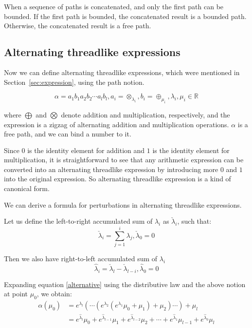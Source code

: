 When a sequence of paths is concatenated, and only the first path can be bounded.
If the first path is bounded, the concatenated result is a bounded path.
Otherwise, the concatenated result is a free path.

\subsection{Alternating threadlike expressions}\label{sec:alternating}

Now we can define alternating threadlike expressions, which were mentioned in Section~\ref{sec:expression}, using the path notion.

\begin{equation}\label{alternative}
    \alpha = a_1 b_1 a_2 b_2 \cdots a_l b_l, a_i = \otimes_{\lambda_i}, b_i = \oplus_{\mu_i}, \lambda_i, \mu_i \in \mathbb{R}
\end{equation}

where $\bigoplus$ and $\bigotimes$ denote addition and multiplication, respectively,
and the expression is a zigzag of alternating addition and multiplication operations.
$\alpha$ is a free path, and we can bind a number to it.

Since $0$ is the identity element for addition and $1$ is the identity element for multiplication,
it is straightforward to see that any arithmetic expression can be converted into an alternating threadlike expression
by introducing more $0$ and $1$ into the original expression. So alternating threadlike expression is a kind of canonical form.

We can derive a formula for perturbations in alternating threadlike expressions.

Let us define the left-to-right accumulated sum of $\lambda_i$ as $\check{\lambda}_i$, such that:
\begin{equation}
\check{\lambda}_i = \sum_{j=1}^i \lambda_j, \check{\lambda}_0 = 0
\end{equation}

Then we also have right-to-left accumulated sum of $\lambda_i$
\begin{equation}
\hat{\lambda}_i = \check{\lambda}_l - \check{\lambda}_{l - i}, \hat{\lambda}_0 = 0
\end{equation}

Expanding equation \eqref{alternative} using the distributive law and the above notion at point $\mu_0$, we obtain:
\begin{align}
\alpha(\mu_0) & = e^{\lambda_l}(\cdots (e^{\lambda_2} (e^{\lambda_1} \mu_0 + \mu_1) + \mu_2) \cdots) + \mu_l \\
& = e^{\hat{\lambda}_l} \mu_0 + e^{\hat{\lambda}_{l - 1}} \mu_1  + e^{\hat{\lambda}_{l - 2}} \mu_2 + \cdots + e^{\hat{\lambda}_1} \mu_{l - 1} + e^{\hat{\lambda}_0} \mu_l
\end{align}

